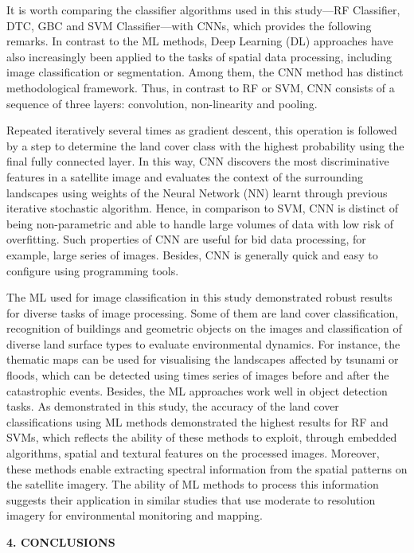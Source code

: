 \documentclass[12pt,a4paper,oneside]{article}
\def \newsection{\vspace{12pt}\textbf}
\def \newpar{\vspace{6pt}}
\begin{document}
\newpar It is worth comparing the classifier algorithms used in this study—RF Classifier, DTC, GBC and SVM Classifier—with CNNs, which provides the following remarks. In contrast to the ML methods, Deep Learning (DL) approaches have also increasingly been applied to the tasks of spatial data processing, including image classification or segmentation. Among them, the CNN method has distinct methodological framework. Thus, in contrast to RF or SVM, CNN consists of a sequence of three layers: convolution, non-linearity and pooling.

\newpar Repeated iteratively several times as gradient descent, this operation is followed by a step to determine the land cover class with the highest probability using the final fully connected layer. In this way, CNN discovers the most discriminative features in a satellite image and evaluates the context of the surrounding landscapes using weights of the Neural Network (NN) learnt through previous iterative stochastic algorithm. Hence, in comparison to SVM, CNN is distinct of being non-parametric and able to handle large volumes of data with low risk of overfitting. Such properties of CNN are useful for bid data processing, for example, large series of images. Besides, CNN is generally quick and easy to configure using programming tools.

\newpar The ML used for image classification in this study demonstrated robust results for diverse tasks of image processing. Some of them are land cover classification, recognition of buildings and geometric objects on the images and classification of diverse land surface types to evaluate environmental dynamics. For instance, the thematic maps can be used for visualising the landscapes affected by tsunami or floods, which can be detected using times series of images before and after the catastrophic events. Besides, the ML approaches work well in object detection tasks. As demonstrated in this study, the accuracy of the land cover classifications using ML methods demonstrated the highest results for RF and SVMs, which reflects the ability of these methods to exploit, through embedded algorithms, spatial and textural features on the processed images. Moreover, these methods enable extracting spectral information from the spatial patterns on the satellite imagery. The ability of ML methods to process this information suggests their application in similar studies that use moderate to resolution imagery for environmental monitoring and mapping.
 
\newsection {4. CONCLUSIONS}
\end{document}

